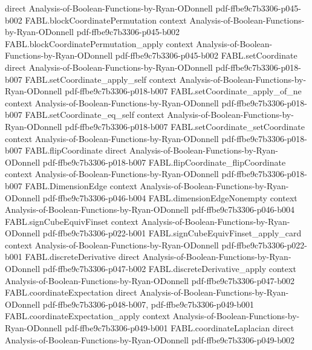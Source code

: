 \begin{theorem}
  {direct}
  {Analysis-of-Boolean-Functions-by-Ryan-ODonnell}
  {pdf-ffbe9c7b3306-p045-b002}
\proofstep
  {FABL.blockCoordinatePermutation}
  {context}
  {Analysis-of-Boolean-Functions-by-Ryan-ODonnell}
  {pdf-ffbe9c7b3306-p045-b002}
\proofstep
  {FABL.blockCoordinatePermutation_apply}
  {context}
  {Analysis-of-Boolean-Functions-by-Ryan-ODonnell}
  {pdf-ffbe9c7b3306-p045-b002}
\proofstep
  {FABL.setCoordinate}
  {direct}
  {Analysis-of-Boolean-Functions-by-Ryan-ODonnell}
  {pdf-ffbe9c7b3306-p018-b007}
\proofstep
  {FABL.setCoordinate_apply_self}
  {context}
  {Analysis-of-Boolean-Functions-by-Ryan-ODonnell}
  {pdf-ffbe9c7b3306-p018-b007}
\proofstep
  {FABL.setCoordinate_apply_of_ne}
  {context}
  {Analysis-of-Boolean-Functions-by-Ryan-ODonnell}
  {pdf-ffbe9c7b3306-p018-b007}
\proofstep
  {FABL.setCoordinate_eq_self}
  {context}
  {Analysis-of-Boolean-Functions-by-Ryan-ODonnell}
  {pdf-ffbe9c7b3306-p018-b007}
\proofstep
  {FABL.setCoordinate_setCoordinate}
  {context}
  {Analysis-of-Boolean-Functions-by-Ryan-ODonnell}
  {pdf-ffbe9c7b3306-p018-b007}
\proofstep
  {FABL.flipCoordinate}
  {direct}
  {Analysis-of-Boolean-Functions-by-Ryan-ODonnell}
  {pdf-ffbe9c7b3306-p018-b007}
\proofstep
  {FABL.flipCoordinate_flipCoordinate}
  {context}
  {Analysis-of-Boolean-Functions-by-Ryan-ODonnell}
  {pdf-ffbe9c7b3306-p018-b007}
\proofstep
  {FABL.DimensionEdge}
  {context}
  {Analysis-of-Boolean-Functions-by-Ryan-ODonnell}
  {pdf-ffbe9c7b3306-p046-b004}
\proofstep
  {FABL.dimensionEdgeNonempty}
  {context}
  {Analysis-of-Boolean-Functions-by-Ryan-ODonnell}
  {pdf-ffbe9c7b3306-p046-b004}
\proofstep
  {FABL.signCubeEquivFinset}
  {context}
  {Analysis-of-Boolean-Functions-by-Ryan-ODonnell}
  {pdf-ffbe9c7b3306-p022-b001}
\proofstep
  {FABL.signCubeEquivFinset_apply_card}
  {context}
  {Analysis-of-Boolean-Functions-by-Ryan-ODonnell}
  {pdf-ffbe9c7b3306-p022-b001}
\proofstep
  {FABL.discreteDerivative}
  {direct}
  {Analysis-of-Boolean-Functions-by-Ryan-ODonnell}
  {pdf-ffbe9c7b3306-p047-b002}
\proofstep
  {FABL.discreteDerivative_apply}
  {context}
  {Analysis-of-Boolean-Functions-by-Ryan-ODonnell}
  {pdf-ffbe9c7b3306-p047-b002}
\proofstep
  {FABL.coordinateExpectation}
  {direct}
  {Analysis-of-Boolean-Functions-by-Ryan-ODonnell}
  {pdf-ffbe9c7b3306-p048-b007,
    pdf-ffbe9c7b3306-p049-b001}
\proofstep
  {FABL.coordinateExpectation_apply}
  {context}
  {Analysis-of-Boolean-Functions-by-Ryan-ODonnell}
  {pdf-ffbe9c7b3306-p049-b001}
\proofstep
  {FABL.coordinateLaplacian}
  {direct}
  {Analysis-of-Boolean-Functions-by-Ryan-ODonnell}
  {pdf-ffbe9c7b3306-p049-b002}
\proofstep

\end{theorem}
